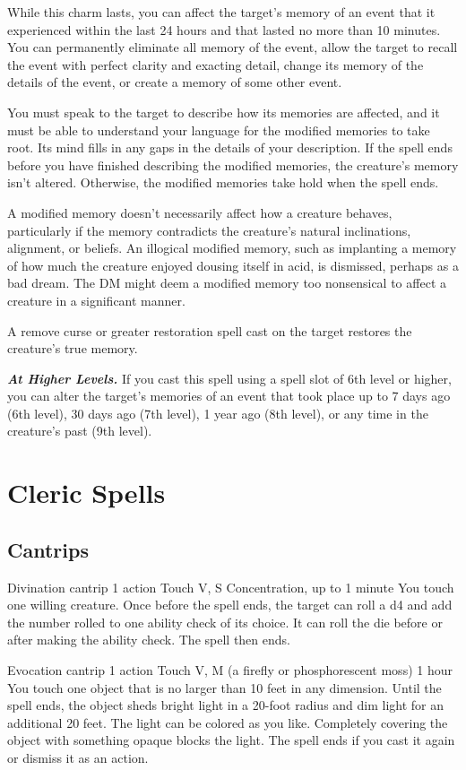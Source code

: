 \documentclass[10pt,twoside,twocolumn,openany]{book}
\newcommand\impact[1]{
	\textbf{\textit{#1}}
}
\begin{document}
While this charm lasts, you can affect the target's memory of an event that it experienced within the last 24 hours and that lasted no more than 10 minutes. You can permanently eliminate all memory of the event, allow the target to recall the event with perfect clarity and exacting detail, change its memory of the details of the event, or create a memory of some other event.

You must speak to the target to describe how its memories are affected, and it must be able to understand your language for the modified memories to take root. Its mind fills in any gaps in the details of your description. If the spell ends before you have finished describing the modified memories, the creature's memory isn't altered. Otherwise, the modified memories take hold when the spell ends.

A modified memory doesn't necessarily affect how a creature behaves, particularly if the memory contradicts the creature's natural inclinations, alignment, or beliefs. An illogical modified memory, such as implanting a memory of how much the creature enjoyed dousing itself in acid, is dismissed, perhaps as a bad dream. The DM might deem a modified memory too nonsensical to affect a creature in a significant manner.

A remove curse or greater restoration spell cast on the target restores the creature's true memory.

\impact{At Higher Levels.} If you cast this spell using a spell slot of 6th level or higher, you can alter the target's memories of an event that took place up to 7 days ago (6th level), 30 days ago (7th level), 1 year ago (8th level), or any time in the creature's past (9th level).

\chapter{Cleric Spells}
\section{Cantrips}
{Divination cantrip}
{\color{action} 1 action}
{Touch}
{V, S}
{{\color{concentration}Concentration}, up to 1 minute}
%
You touch one willing creature. Once before the spell ends, the target can roll a d4 and add the number rolled to one ability check of its choice. It can roll the die before or after making the ability check. The spell then ends. 

{Evocation cantrip}
{\color{action} 1 action}
{Touch}
{V, M (a firefly or phosphorescent moss)}
{1 hour}
%
You touch one object that is no larger than 10 feet in any dimension. Until the 
spell ends, the object sheds bright light in a 20-foot radius and dim light 
for an additional 20 feet. The light can be colored as you like. Completely 
covering the object with something opaque blocks the light. The spell ends 
if you cast it again or dismiss it as an action. 
\end{document}
